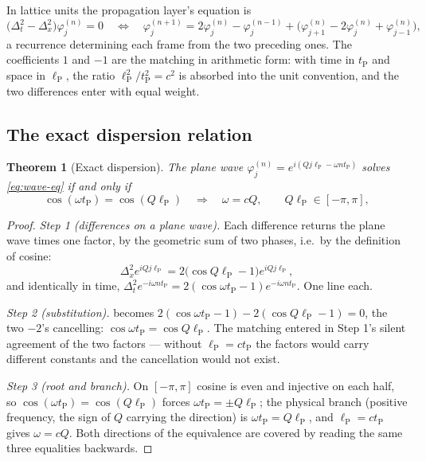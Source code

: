 \documentclass[11pt]{amsbook}
\theoremstyle{plain}
\newtheorem{theorem}{Theorem}[chapter]
\theoremstyle{definition}
\theoremstyle{remark}
\newcommand{\uses}[1]{\par\nopagebreak\noindent{\footnotesize\emph{Uses: #1.}\par}}
\begin{document}
In lattice units the propagation layer's equation is
\begin{equation}\label{eq:wave-eq}
\bigl(\Delta_{t}^{2} - \Delta_{x}^{2}\bigr)\varphi_{j}^{(n)} = 0
\quad\Longleftrightarrow\quad
\varphi_{j}^{(n+1)} = 2\varphi_{j}^{(n)} - \varphi_{j}^{(n-1)} + \bigl(\varphi_{j+1}^{(n)} - 2\varphi_{j}^{(n)} + \varphi_{j-1}^{(n)}\bigr),
\end{equation}
a recurrence determining each frame from the two preceding ones. The coefficients $1$ and $-1$ are the matching in arithmetic form: with time in $t_{\mathrm P}$ and space in $\ell_{\mathrm P}$, the ratio $\ell_{\mathrm P}^{2}/t_{\mathrm P}^{2} = c^{2}$ is absorbed into the unit convention, and the two differences enter with equal weight.

\subsection{The exact dispersion relation}\label{sec:dispersion}

\begin{theorem}[Exact dispersion]\label{thm:dispersion}
The plane wave $\varphi_{j}^{(n)} = e^{i(Qj\ell_{\mathrm P} - \omega n t_{\mathrm P})}$ solves \cref{eq:wave-eq} if and only if
\begin{equation}\label{eq:exact-dispersion}
\cos(\omega t_{\mathrm P}) = \cos(Q\ell_{\mathrm P})
\quad\Longrightarrow\quad
\omega = cQ, \qquad Q\ell_{\mathrm P} \in [-\pi, \pi],
\end{equation}
\uses{\cref{eq:wave-eq}, \cref{def:units}}
\end{theorem}

\begin{proof}
\emph{Step 1 (differences on a plane wave).} Each difference returns the plane wave times one factor, by the geometric sum of two phases, i.e.\ by the definition of cosine:
\begin{equation}\label{eq:fourier-action}
\Delta_{x}^{2}e^{iQj\ell_{\mathrm P}} = 2\bigl(\cos Q\ell_{\mathrm P} - 1\bigr)e^{iQj\ell_{\mathrm P}},
\end{equation}
and identically in time, $\Delta_{t}^{2}e^{-i\omega n t_{\mathrm P}} = 2(\cos\omega t_{\mathrm P} - 1)e^{-i\omega n t_{\mathrm P}}$. One line each.

\emph{Step 2 (substitution).}  becomes $2(\cos\omega t_{\mathrm P} - 1) - 2(\cos Q\ell_{\mathrm P} - 1) = 0$, the two $-2$'s cancelling: $\cos\omega t_{\mathrm P} = \cos Q\ell_{\mathrm P}$. The matching entered in Step 1's silent agreement of the two factors --- without $\ell_{\mathrm P} = ct_{\mathrm P}$ the factors would carry different constants and the cancellation would not exist.

\emph{Step 3 (root and branch).} On $[-\pi, \pi]$ cosine is even and injective on each half, so $\cos(\omega t_{\mathrm P}) = \cos(Q\ell_{\mathrm P})$ forces $\omega t_{\mathrm P} = \pm Q\ell_{\mathrm P}$; the physical branch (positive frequency, the sign of $Q$ carrying the direction) is $\omega t_{\mathrm P} = Q\ell_{\mathrm P}$, and $\ell_{\mathrm P} = ct_{\mathrm P}$ gives $\omega = cQ$. Both directions of the equivalence are covered by reading the same three equalities backwards.
\end{proof}
\end{document}
